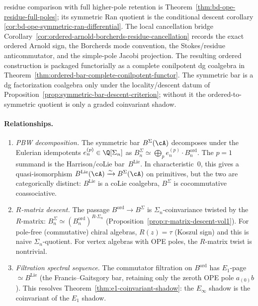 residue comparison with full higher-pole retention is
Theorem~\ref{thm:bd-ope-residue-full-poles}; its
symmetric Ran quotient is the conditional descent corollary
\ref{cor:bd-ope-symmetric-ran-differential}.
The local cancellation bridge
Corollary~\ref{cor:ordered-arnold-borcherds-residue-cancellation}
records the exact ordered Arnold sign, the Borcherds mode convention,
the Stokes/residue anticommutator, and the simple-pole Jacobi
projection.
The resulting ordered construction is packaged functorially as a
complete conilpotent dg coalgebra in
Theorem~\ref{thm:ordered-bar-complete-conilpotent-functor}.
The symmetric bar is a dg factorization coalgebra only under the
locality/descent datum of
Proposition~\ref{prop:symmetric-bar-descent-criterion}; without it the
ordered-to-symmetric quotient is only a graded coinvariant shadow.

\paragraph{Relationships.}
\begin{enumerate}
\item \emph{PBW decomposition.}
 The symmetric bar $B^\Sigma(\cA)$ decomposes under the Eulerian
 idempotents $e^{(p)}_n \in \Q[\Sigma_n]$ as
 $B^\Sigma_n \simeq \bigoplus_p e^{(p)}_n \cdot B^{\mathrm{ord}}_n$.
 The $p = 1$ summand is the Harrison/coLie bar~$B^{\mathrm{Lie}}$.
 In characteristic~$0$, this gives a quasi-isomorphism
 $B^{\mathrm{Lie}}(\cA) \xrightarrow{\sim} B^\Sigma(\cA)$
 on primitives, but the two are categorically distinct:
 $B^{\mathrm{Lie}}$ is a coLie coalgebra, $B^\Sigma$ is cocommutative
 coassociative.
\item \emph{$R$-matrix descent.}
 The passage $B^{\mathrm{ord}} \to B^\Sigma$ is
 $\Sigma_n$-coinvariance twisted by the $R$-matrix:
 $B^\Sigma_n \simeq (B^{\mathrm{ord}}_n)^{R\text{-}\Sigma_n}$
 (Proposition~\ref{prop:r-matrix-descent-vol1}). For pole-free
 (commutative) chiral algebras, $R(z) = \tau$ (Koszul sign)
 and this is naive $\Sigma_n$-quotient. For vertex algebras with
 OPE poles, the $R$-matrix twist is nontrivial.
\item \emph{Filtration spectral sequence.}
 The commutator filtration on $B^{\mathrm{ord}}$ has
 $E_1$-page $\simeq B^{\mathrm{Lie}}$ (the Francis--Gaitsgory
 bar, retaining only the zeroth OPE pole $a_{(0)}b$).
 This resolves Theorem~\ref{thm:e1-coinvariant-shadow}:
 the $E_\infty$ shadow is the coinvariant of the $E_1$ shadow.
\end{enumerate}

